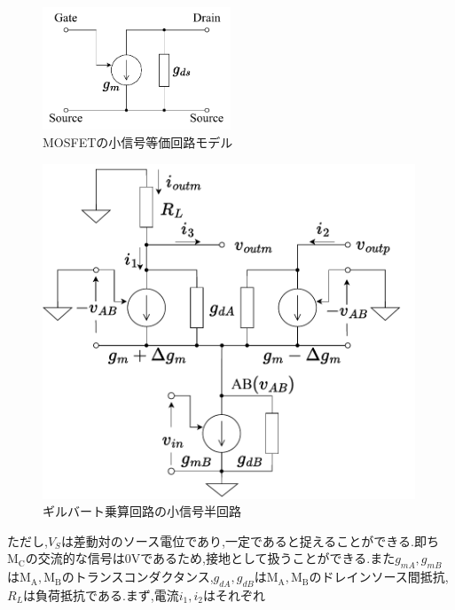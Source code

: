             \begin{figure}[!b]
                \centering
                \includegraphics[width=0.5\textwidth]{figures/chapter2/mos_eq.pdf}
                \caption{MOSFETの小信号等価回路モデル}
                \label{fig:2_moseq}
            \end{figure}
            \begin{figure}[!b]
                \centering
                \includegraphics[width=0.99\textwidth]{figures/chapter2/halfeq.pdf}
                \caption{ギルバート乗算回路の小信号半回路}
                \label{fig:2_half}
            \end{figure}
            \clearpage
            ただし,$V_{S}$は差動対のソース電位であり,一定であると捉えることができる.即ち$\mathrm{M_{C}}$の交流的な信号は$0\mathrm{ V}$であるため,接地として扱うことができる.また$g_{mA},g_{mB}$は$\mathrm{M_{A},M_{B}}$のトランスコンダクタンス,$g_{dA},g_{dB}$は$\mathrm{M_{A},M_{B}}$のドレインソース間抵抗,$R_{L}$は負荷抵抗である.まず,電流$i_{1},i_{2}$はそれぞれ

